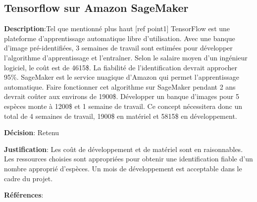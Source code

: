 

\subsection{Tensorflow sur Amazon SageMaker}
\label{s:identifier_conc2}

\textbf{Description}:Tel que mentionné plus haut [ref point1] TensorFlow est une plateforme d’apprentissage automatique libre d’utilisation.  Avec une banque d’image pré-identifiées, 3 semaines de travail sont estimées pour développer l'algorithme d’apprentissage et l’entraîner. Selon le salaire moyen d’un ingénieur logiciel, le coût est de 4615\$.  La fiabilité de l’identification devrait approcher 95\%. SageMaker est le service nuagique d’Amazon qui permet l’apprentissage automatique. Faire fonctionner cet algorithme sur SageMaker pendant 2 ans devrait coûter aux environs de 1900\$. Développer un banque d’images pour 5 espèces monte à 1200\$ et 1 semaine de travail. Ce concept nécessitera donc un total de 4 semaines de travail, 1900\$ en matériel et 5815\$ en développement.

\textbf{Décision}: Retenu

\textbf{Justification}: Les coût de développement et de matériel sont en raisonnables. Les ressources choisies sont appropriées pour obtenir une identification fiable d’un nombre approprié d’espèces. Un mois de développement est acceptable dans le cadre du projet.

\textbf{Références}:
\cite{tensorFlow, amzSage, fishID_2016, sal_ingLog}